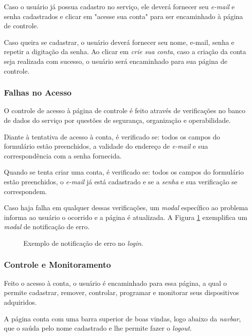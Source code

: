 \documentclass[a4paper, 12pt]{article}
\begin{document}
Caso o usuário já possua cadastro no serviço, ele deverá fornecer seu \textit{e-mail} e senha cadastrados e clicar em "acesse sua conta" para ser encaminhado à página de controle.

Caso queira se cadastrar, o usuário deverá fornecer seu nome, e-mail, senha e repetir a digitação da senha. Ao clicar em \textit{crie sua conta}, caso a criação da conta seja realizada com sucesso, o usuário será encaminhado para sua página de controle.

\subsubsection{Falhas no Acesso}

O controle de acesso à página de controle é feito através de verificações no banco de dados do serviço por questões de segurança, organização e operabilidade.

Diante à tentativa de acesso à conta, é verificado se: todos os campos do formulário estão preenchidos, a validade do endereço de \textit{e-mail} e sua correspondência com a senha fornecida.

Quando se tenta criar uma conta, é verificado se: todos os campos do formulário estão preenchidos, o \textit{e-mail} já está cadastrado e se a \textit{senha} e sua verificação se correspondem.

Caso haja falha em qualquer dessas verificações, um \textit{modal} específico ao problema informa ao usuário o ocorrido e a página é atualizada. A Figura \ref{fig:modalErro} exemplifica um \textit{modal} de notificação de erro.

\begin{figure}[!ht]
	\centering
	\caption{Exemplo de notificação de erro no \textit{login}.}
	\label{fig:modalErro}
\end{figure}

\subsubsection{Controle e Monitoramento}

Feito o acesso à conta, o usuário é encaminhado para essa página, a qual o permite cadastrar, remover, controlar, programar e monitorar seus dispositivos adquiridos.

A página conta com uma barra superior de boas vindas, logo abaixo da \textit{navbar}, que o saúda pelo nome cadastrado e lhe permite fazer o \textit{logout}.
\end{document}
